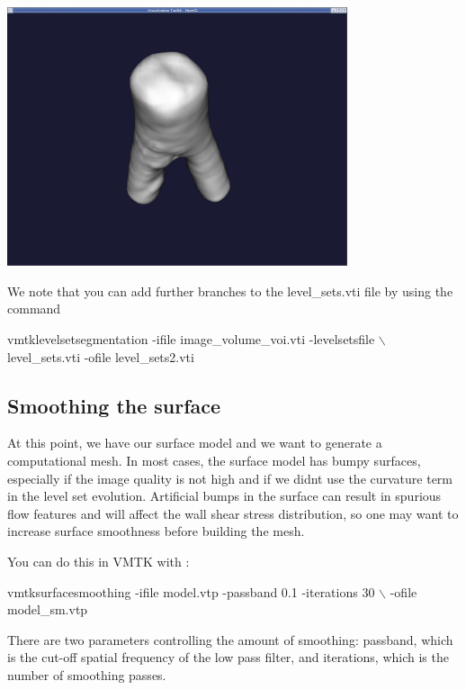  
\begin{DoxyImageNoCaption}
  \mbox{\includegraphics[width=0.75\textwidth]{surfaceviewer2}}
\end{DoxyImageNoCaption}


We note that you can add further branches to the {\ttfamily level\+\_\+sets.\+vti} file by using the command


\begin{DoxyCode}
 vmtklevelsetsegmentation -ifile image\_volume\_voi.vti -levelsetsfile \(\backslash\)
level\_sets.vti -ofile level\_sets2.vti
\end{DoxyCode}




 

\hypertarget{index_smooth}{}\subsection{Smoothing the surface}\label{index_smooth}
At this point, we have our surface model and we want to generate a computational mesh. In most cases, the surface model has bumpy surfaces, especially if the image quality is not high and if we didn\textquotesingle{}t use the curvature term in the level set evolution. Artificial bumps in the surface can result in spurious flow features and will affect the wall shear stress distribution, so one may want to increase surface smoothness before building the mesh.

You can do this in V\+M\+TK with \+: 
\begin{DoxyCode}
 vmtksurfacesmoothing -ifile model.vtp -passband 0.1 -iterations 30 \(\backslash\)
-ofile model\_sm.vtp
\end{DoxyCode}


There are two parameters controlling the amount of smoothing\+: passband, which is the cut-\/off spatial frequency of the low pass filter, and iterations, which is the number of smoothing passes.

